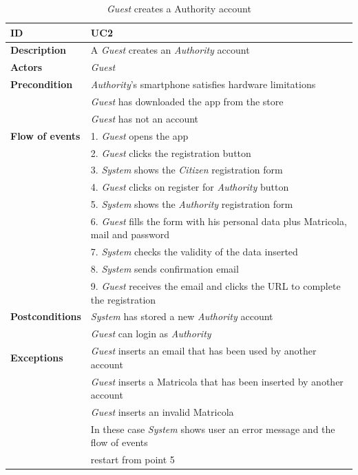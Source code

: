 \documentclass{article}
\begin{document}
\clearpage
\begin{table}
    \begin{center}
    \centering
\begin{tabular}{ | l | l |}
\hline
\textbf{ID} & UC2 \\
\hline
\textbf{Description} & A \textit{Guest} creates an \textit{Authority} account \\
\hline
\textbf{Actors} & \textit{Guest} \\
\hline
\textbf{Precondition} & \textit{Authority}'s smartphone satisfies hardware limitations \\
             & \textit{Guest} has downloaded the app from the store \\
             & \textit{Guest} has not an account\\ 
\hline
\textbf{Flow of events} & 1. \textit{Guest} opens the app \\
                        & 2. \textit{Guest} clicks the registration button \\
                        & 3. \textit{System} shows the \textit{Citizen} registration form \\
                        & 4. \textit{Guest} clicks on register for \textit{Authority} button \\
                        & 5. \textit{System} shows the \textit{Authority} registration form \\
                        & 6. \textit{Guest} fills the form with his personal data plus Matricola, mail and password \\
                        & 7. \textit{System} checks the validity of the data inserted \\
                        & 8. \textit{System} sends confirmation email \\
                        & 9. \textit{Guest} receives the email and clicks the URL to complete the registration \\  
\hline
\textbf{Postconditions} & \textit{System} has stored a new \textit{Authority} account  \\
                        & \textit{Guest} can login as \textit{Authority} \\
\hline
\textbf{Exceptions} & \textit{Guest} inserts an email that has been used by another account \\
                    & \textit{Guest} inserts a Matricola that has been inserted by another account \\
                    & \textit{Guest} inserts an invalid Matricola \\
                    & In these case \textit{System} shows user an error message and the flow of events  \\
                    & restart from point 5 \\  
\hline
\end{tabular}
\caption{\textit{Guest} creates a Authority account}
\end{center}
\end{table}
\end{document}
